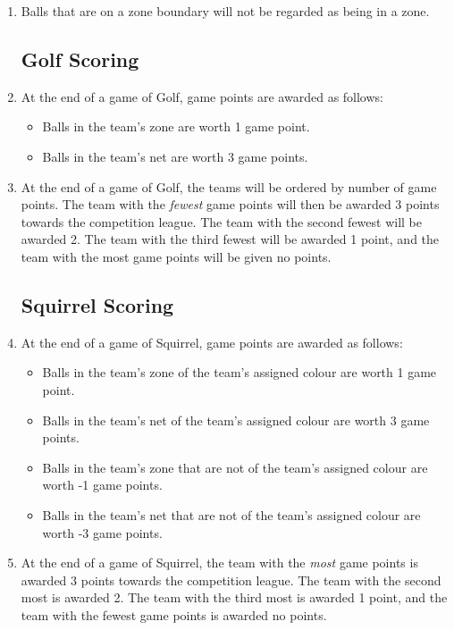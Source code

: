 \begin{enumerate}
\item Balls that are on a zone boundary will not be regarded as being in a zone.

\subsection{Golf Scoring}
\item At the end of a game of Golf, game points are awarded as follows:
\begin{itemize}
\item Balls in the team's zone are worth 1 game point.
\item Balls in the team's net are worth 3 game points.
\end{itemize}

\item At the end of a game of Golf, the teams will be ordered by number of game points.  The team with the \emph{fewest} game points will then be awarded 3 points towards the competition league.  The team with the second fewest will be awarded 2.  The team with the third fewest will be awarded 1 point, and the team with the most game points will be given no points.

\subsection{Squirrel Scoring}
\item At the end of a game of Squirrel, game points are awarded as follows:
\begin{itemize}
\item Balls in the team's zone of the team's assigned colour are worth 1 game point.
\item Balls in the team's net of the team's assigned colour are worth 3 game points.
\item Balls in the team's zone that are not of the team's assigned colour are worth -1 game points.
\item Balls in the team's net that are not of the team's assigned colour are worth -3 game points.
\end{itemize}

\item At the end of a game of Squirrel, the team with the \emph{most} game points is awarded 3 points towards the competition league.  The team with the second most is awarded 2.  The team with the third most is awarded 1 point, and the team with the fewest game points is awarded no points.

\end{enumerate}
